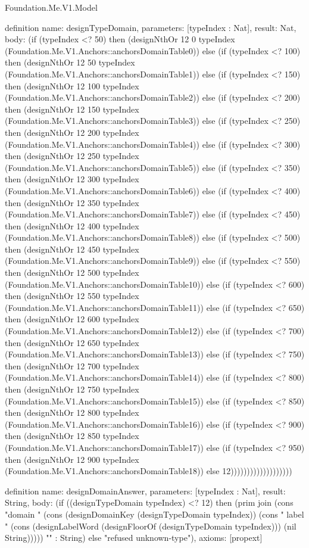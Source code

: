 \begin{lexlean}{Foundation.Me.V1.Model}
\begin{semanticmodule}
definition{
  name: designTypeDomain,
  parameters: [typeIndex : Nat],
  result: Nat,
  body: (if (typeIndex <? 50) then (designNthOr 12 0 typeIndex (Foundation.Me.V1.Anchors::anchorsDomainTable0)) else (if (typeIndex <? 100) then (designNthOr 12 50 typeIndex (Foundation.Me.V1.Anchors::anchorsDomainTable1)) else (if (typeIndex <? 150) then (designNthOr 12 100 typeIndex (Foundation.Me.V1.Anchors::anchorsDomainTable2)) else (if (typeIndex <? 200) then (designNthOr 12 150 typeIndex (Foundation.Me.V1.Anchors::anchorsDomainTable3)) else (if (typeIndex <? 250) then (designNthOr 12 200 typeIndex (Foundation.Me.V1.Anchors::anchorsDomainTable4)) else (if (typeIndex <? 300) then (designNthOr 12 250 typeIndex (Foundation.Me.V1.Anchors::anchorsDomainTable5)) else (if (typeIndex <? 350) then (designNthOr 12 300 typeIndex (Foundation.Me.V1.Anchors::anchorsDomainTable6)) else (if (typeIndex <? 400) then (designNthOr 12 350 typeIndex (Foundation.Me.V1.Anchors::anchorsDomainTable7)) else (if (typeIndex <? 450) then (designNthOr 12 400 typeIndex (Foundation.Me.V1.Anchors::anchorsDomainTable8)) else (if (typeIndex <? 500) then (designNthOr 12 450 typeIndex (Foundation.Me.V1.Anchors::anchorsDomainTable9)) else (if (typeIndex <? 550) then (designNthOr 12 500 typeIndex (Foundation.Me.V1.Anchors::anchorsDomainTable10)) else (if (typeIndex <? 600) then (designNthOr 12 550 typeIndex (Foundation.Me.V1.Anchors::anchorsDomainTable11)) else (if (typeIndex <? 650) then (designNthOr 12 600 typeIndex (Foundation.Me.V1.Anchors::anchorsDomainTable12)) else (if (typeIndex <? 700) then (designNthOr 12 650 typeIndex (Foundation.Me.V1.Anchors::anchorsDomainTable13)) else (if (typeIndex <? 750) then (designNthOr 12 700 typeIndex (Foundation.Me.V1.Anchors::anchorsDomainTable14)) else (if (typeIndex <? 800) then (designNthOr 12 750 typeIndex (Foundation.Me.V1.Anchors::anchorsDomainTable15)) else (if (typeIndex <? 850) then (designNthOr 12 800 typeIndex (Foundation.Me.V1.Anchors::anchorsDomainTable16)) else (if (typeIndex <? 900) then (designNthOr 12 850 typeIndex (Foundation.Me.V1.Anchors::anchorsDomainTable17)) else (if (typeIndex <? 950) then (designNthOr 12 900 typeIndex (Foundation.Me.V1.Anchors::anchorsDomainTable18)) else 12)))))))))))))))))))
}

definition{
  name: designDomainAnswer,
  parameters: [typeIndex : Nat],
  result: String,
  body: (if ((designTypeDomain typeIndex) <? 12) then (prim join (cons "domain " (cons (designDomainKey (designTypeDomain typeIndex)) (cons " label " (cons (designLabelWord (designFloorOf (designTypeDomain typeIndex))) (nil String))))) "" : String) else "refused unknown-type"),
  axioms: [propext]
}
\end{semanticmodule}
\end{lexlean}
